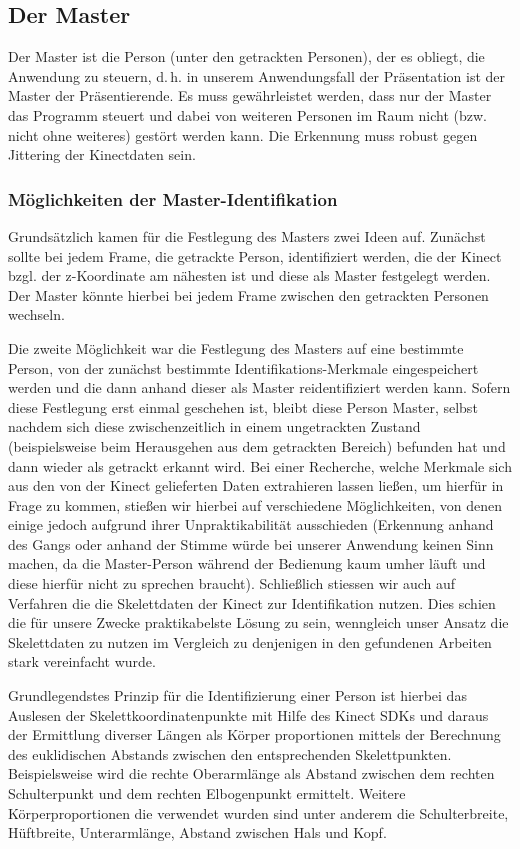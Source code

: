 \subsection{Der Master}
	Der Master ist die Person (unter den getrackten Personen), der es obliegt, die Anwendung zu steuern, d.\,h. in unserem Anwendungsfall der Präsentation ist der Master der Präsentierende.
	Es muss gewährleistet werden, dass nur der Master das Programm steuert und dabei von weiteren Personen im Raum nicht (bzw. nicht ohne weiteres) gestört werden kann. Die Erkennung muss robust gegen Jittering der Kinectdaten sein.\par
\subsubsection{Möglichkeiten der Master-Identifikation}
	Grundsätzlich kamen für die Festlegung des Masters zwei Ideen auf. Zunächst sollte bei jedem Frame, die getrackte Person, identifiziert werden, die der Kinect bzgl. der z-Koordinate am nähesten ist und diese als Master festgelegt werden. Der Master könnte hierbei bei jedem Frame zwischen den getrackten Personen wechseln. \par
	Die zweite Möglichkeit war die Festlegung des Masters auf eine bestimmte Person, von der zunächst bestimmte Identifikations-Merkmale eingespeichert werden und die dann anhand dieser als Master reidentifiziert werden kann. Sofern diese Festlegung erst einmal geschehen ist, bleibt diese Person Master, selbst nachdem sich diese zwischenzeitlich in einem ungetrackten Zustand (beispielsweise beim Herausgehen aus dem getrackten Bereich) befunden hat und dann wieder als getrackt erkannt wird. Bei einer Recherche, welche Merkmale sich aus den von der Kinect gelieferten Daten extrahieren lassen ließen, um hierfür in Frage zu kommen, stießen wir hierbei auf verschiedene Möglichkeiten, von denen einige jedoch aufgrund ihrer Unpraktikabilität ausschieden (Erkennung anhand des Gangs oder anhand der Stimme würde bei unserer Anwendung keinen Sinn machen, da die Master-Person während der Bedienung kaum umher läuft und diese hierfür nicht zu sprechen braucht). Schließlich stiessen wir auch auf Verfahren die die Skelettdaten der Kinect zur Identifikation nutzen. Dies schien die für unsere Zwecke praktikabelste Lösung zu sein, wenngleich unser Ansatz die Skelettdaten zu nutzen im Vergleich zu denjenigen in den gefundenen Arbeiten stark vereinfacht wurde.\par
	Grundlegendstes Prinzip für die Identifizierung einer Person ist hierbei das Auslesen der Skelettkoordinatenpunkte mit Hilfe des Kinect SDKs und daraus der Ermittlung diverser Längen als Körper proportionen mittels der Berechnung des euklidischen Abstands zwischen den entsprechenden Skelettpunkten. Beispielsweise wird die rechte Oberarmlänge als Abstand zwischen dem rechten Schulterpunkt und dem rechten Elbogenpunkt ermittelt. Weitere Körperproportionen die verwendet wurden sind unter anderem die Schulterbreite, Hüftbreite, Unterarmlänge, Abstand zwischen Hals und Kopf. \par

